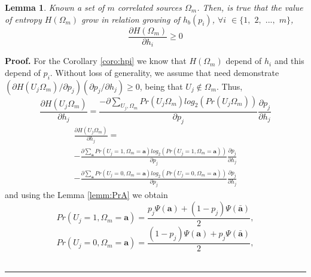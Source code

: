\documentclass[a4paper,10pt]{article}
\newtheorem{mylemma}[mytheorem]{Lemma}
\newenvironment{myproof}[1][Proof]{\textbf{#1.} }{\ \rule{0.5em}{0.5em}}
\begin{document}
\begin{mdframed}[style=MDFStyGrayScreen]
\begin{mylemma}
 \label{lemm:dH}
Known a set of $m$ correlated  sources  $\Omega_m$. Then, is true that
the value of entropy $H(\Omega_m)$ grow in relation growing of $h_b(p_i)$, 
$\forall i$ $\in \{1,$ $2,$ $...,$ $m\}$,
\begin{equation}\label{eq:dH1}
 \frac{\partial H(\Omega_m)}{\partial h_i} \geq 0
\end{equation}
\end{mylemma}
\end{mdframed}

\begin{myproof}
 \label{proof:dH} 
For the Corollary \ref{coro:hpi} we know that $H(\Omega_m)$ depend of $h_i$
and this depend of $p_i$. Without loss of generality, 
we assume that need demonstrate
$({\partial H(U_j\Omega_{m})}/{\partial p_j}) ({\partial p_j}/{\partial h_j}) \geq 0$,
being that $U_j \notin \Omega_{m}$. Thus,
\small
\begin{equation}\label{eq:dH2}
 \frac{\partial H(U_j\Omega_{m})}{\partial h_j} =\frac{-\partial \sum \limits_{U_j,\Omega_{m}} Pr(U_j\Omega_{m}) log_2(Pr(U_j\Omega_{m}))}{\partial p_j}\frac{\partial p_j}{\partial h_j} 
\end{equation}
\normalsize
\begin{equation}\label{eq:dH21}
\begin{matrix}
\frac{\partial H(U_j\Omega_{m})}{\partial h_j} =\\
-\frac{\partial \sum \limits_{\mathbf{a}} Pr(U_j=1,\Omega_{m}=\mathbf{a}) log_2(Pr(U_j=1,\Omega_{m}=\mathbf{a}))}{\partial p_j}\frac{\partial p_j}{\partial h_j}  \\
-\frac{\partial \sum \limits_{\mathbf{a}} Pr(U_j=0,\Omega_{m}=\mathbf{a}) log_2(Pr(U_j=0,\Omega_{m}=\mathbf{a}))}{\partial p_j}\frac{\partial p_j}{\partial h_j}
\end{matrix}
\end{equation}
and using the Lemma \ref{lemm:PrA} we obtain
\begin{equation}\label{eq:dH3}
 Pr(U_j=1,\Omega_{m}=\mathbf{a})=\frac{ p_j\Psi(\mathbf{a}) + (1-p_j)\Psi(\mathbf{\bar{a}}) }{2},
\end{equation}
\begin{equation}\label{eq:dH4}
 Pr(U_j=0,\Omega_{m}=\mathbf{a})=\frac{ (1-p_j)\Psi(\mathbf{a}) + p_j\Psi(\mathbf{\bar{a}}) }{2},

\end{equation}
\end{myproof}
\end{document}
